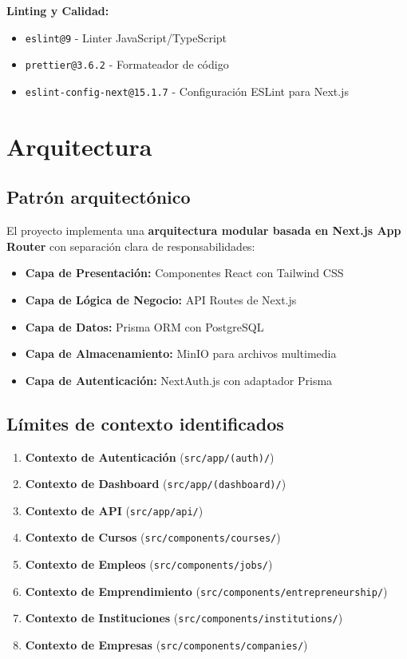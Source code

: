 \documentclass[12pt,a4paper]{article}
\begin{document}
\textbf{Linting y Calidad:}
\begin{itemize}
    \item \texttt{eslint@9} - Linter JavaScript/TypeScript
    \item \texttt{prettier@3.6.2} - Formateador de código
    \item \texttt{eslint-config-next@15.1.7} - Configuración ESLint para Next.js
\end{itemize}

\section{Arquitectura}

\subsection{Patrón arquitectónico}

El proyecto implementa una \textbf{arquitectura modular basada en Next.js App Router} con separación clara de responsabilidades:

\begin{itemize}
    \item \textbf{Capa de Presentación:} Componentes React con Tailwind CSS
    \item \textbf{Capa de Lógica de Negocio:} API Routes de Next.js
    \item \textbf{Capa de Datos:} Prisma ORM con PostgreSQL
    \item \textbf{Capa de Almacenamiento:} MinIO para archivos multimedia
    \item \textbf{Capa de Autenticación:} NextAuth.js con adaptador Prisma
\end{itemize}

\subsection{Límites de contexto identificados}

\begin{enumerate}
    \item \textbf{Contexto de Autenticación} (\texttt{src/app/(auth)/})
    \item \textbf{Contexto de Dashboard} (\texttt{src/app/(dashboard)/})
    \item \textbf{Contexto de API} (\texttt{src/app/api/})
    \item \textbf{Contexto de Cursos} (\texttt{src/components/courses/})
    \item \textbf{Contexto de Empleos} (\texttt{src/components/jobs/})
    \item \textbf{Contexto de Emprendimiento} (\texttt{src/components/entrepreneurship/})
    \item \textbf{Contexto de Instituciones} (\texttt{src/components/institutions/})
    \item \textbf{Contexto de Empresas} (\texttt{src/components/companies/})
\end{enumerate}
\end{document}
